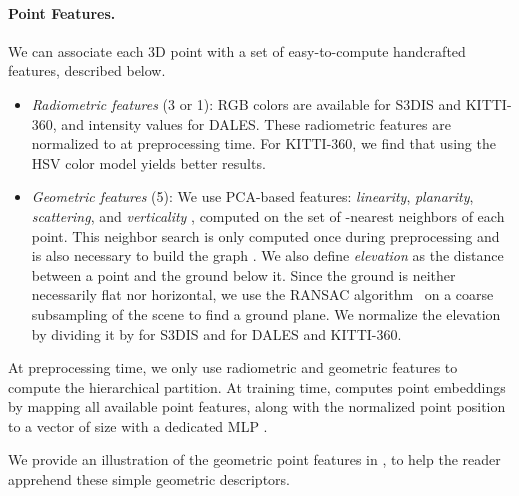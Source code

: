 \paragraph{Point Features.} We can associate each 3D point with a set of 
{ easy-to-compute handcrafted features, described below.}

\begin{itemize}
    \item \textit{Radiometric features} (3 or 1): RGB colors are available for S3DIS and KITTI-360, and intensity values for DALES. These radiometric features are normalized to  at preprocessing time. 
    For KITTI-360, we find that using the HSV color model yields better results.

    \item \textit{Geometric features} (5): We use PCA-based features: \textit{linearity}, \textit{planarity}, \textit{scattering}, \cite{demantke2011dimensionality} and \textit{verticality} \cite{guinard2017weakly}, computed on the set of -nearest neighbors of each point. This neighbor search is only computed once during preprocessing and is also necessary to build the graph .
    We also define \textit{elevation} as the distance between a point and the ground below it. Since the ground is neither necessarily flat nor horizontal, we use the RANSAC algorithm~\cite{fischler1981random} on a coarse subsampling of the scene to find a ground plane. We normalize the elevation by dividing it by  for S3DIS and  for DALES and KITTI-360.

\end{itemize}

At preprocessing time, we only use radiometric and geometric features to compute the hierarchical partition. At training time, \SHORTHAND computes point embeddings by mapping all available point features, along with the normalized point position to a vector of size  with a dedicated MLP .

We provide an illustration of the geometric point features in , to help the reader apprehend these simple geometric descriptors. 




